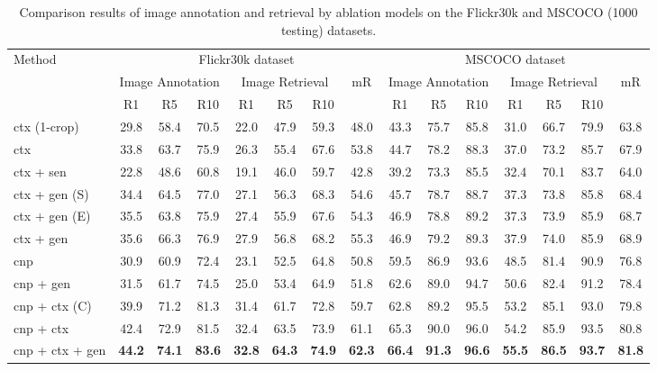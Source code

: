 \documentclass[10pt,twocolumn,letterpaper]{article}
\begin{document}
\begin{table*}[t] \small
\addtolength{\tabcolsep}{-1pt}
\centering
\caption{Comparison results of image annotation and retrieval by ablation models on the Flickr30k and MSCOCO (1000 testing) datasets. }
\begin{tabular}{l|ccc|ccc|c|ccc|ccc|c}
\hline
\hline
\multirow{3}{0.7cm}{Method}  &  \multicolumn{7}{c|}{Flickr30k dataset} &  \multicolumn{7}{c}{MSCOCO dataset}\\
\cline{2-15}
        &  \multicolumn{3}{c|}{Image Annotation}  &  \multicolumn{3}{c|}{Image Retrieval} & \multirow{2}{0.5cm}{{mR}}
&  \multicolumn{3}{c|}{Image Annotation}  &  \multicolumn{3}{c|}{Image Retrieval} & \multirow{2}{0.5cm}{{mR}}  \\
\cline{2-7}
\cline{9-14}
     & R1 & R5  & R10   & R1 & R5  & R10  &
&R1 & R5  & R10   & R1 & R5  & R10  &    \\
\hline

\hspace{0mm} ctx (1-crop)             &29.8 &58.4 &70.5 &22.0 &47.9 &59.3 &48.0  &43.3 &75.7 &85.8 &31.0 &66.7 &79.9 &63.8\\
\hspace{0mm} ctx                      &33.8 &63.7 &75.9 &26.3 &55.4 &67.6 &53.8  &44.7 &78.2 &88.3 &37.0 &73.2 &85.7 &67.9\\
\hline
\hspace{0mm} ctx + sen               &22.8 &48.6 &60.8 &19.1 &46.0 &59.7 &42.8  &39.2 &73.3 &85.5 &32.4 &70.1 &83.7 &64.0\\
\hspace{0mm} ctx + gen (S)           &34.4 &64.5 &77.0 &27.1 &56.3 &68.3 &54.6  &45.7 &78.7 &88.7 &37.3 &73.8 &85.8 &68.4\\
\hspace{0mm} ctx + gen (E)           &35.5 &63.8 &75.9 &27.4 &55.9 &67.6 &54.3  &46.9 &78.8 &89.2 &37.3 &73.9 &85.9 &68.7\\
\hspace{0mm} ctx + gen                &35.6 &66.3 &76.9 &27.9 &56.8 &68.2 &55.3  &46.9 &79.2 &89.3 &37.9 &74.0 &85.9 &68.9\\
\hline
\hspace{0mm} cnp                     &30.9 &60.9 &72.4 &23.1 &52.5 &64.8 &50.8  &59.5 &86.9 &93.6 &48.5 &81.4 &90.9 &76.8\\
\hspace{0mm} cnp + gen               &31.5 &61.7 &74.5 &25.0 &53.4 &64.9 &51.8  &62.6 &89.0 &94.7 &50.6 &82.4 &91.2 &78.4\\
\hspace{0mm} cnp + ctx (C)          &39.9 &71.2 &81.3 &31.4 &61.7 &72.8 &59.7  &62.8 &89.2 &95.5 &53.2 &85.1 &93.0 &79.8\\
\hspace{0mm} cnp + ctx              &42.4 &72.9 &81.5 &32.4 &63.5 &73.9 &61.1  &65.3 &90.0 &96.0 &54.2 &85.9 &93.5 &80.8\\
\hline
\hspace{0mm} cnp + ctx + gen          &\bf{44.2} &\bf{74.1} &\bf{83.6} &\bf{32.8} &\bf{64.3} &\bf{74.9} &\bf{62.3}   &\bf{66.4} &\bf{91.3} &\bf{96.6} &\bf{55.5} &\bf{86.5} &\bf{93.7} &\bf{81.8}\\


\end{tabular}
\end{table*}
\end{document}
